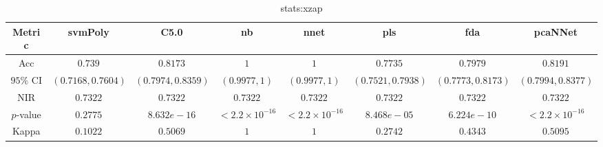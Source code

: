 \begin{table}[!ht]
	\centering
	\begin{tabular}{|c|c|c|c|c|c|c|c|}
		\hline
		Metric & svmPoly & C5.0 & nb & nnet & pls & fda & pcaNNet \\ \hline
		Acc & $0.739$ & $0.8173$ & $1$ & $1$ & $0.7735$ & $0.7979$ & $0.8191$ \\ \hline
		$95\%$ CI & $(0.7168, 0.7604)$ & $(0.7974, 0.8359)$ & $(0.9977, 1)$ & $(0.9977, 1)$ & $(0.7521, 0.7938)$ & $(0.7773, 0.8173)$ & $(0.7994, 0.8377)$ \\ \hline
		NIR & $0.7322$ & $0.7322$ & $0.7322$ & $0.7322$ & $0.7322$ & $0.7322$ & $0.7322$ \\ \hline
		$p$-value & $0.2775$ & $8.632e-16$ & $< 2.2 \times {10}^{-16}$ & $< 2.2 \times {10}^{-16}$ & $8.468e-05$ & $6.224e-10$ & $< 2.2 \times {10}^{-16}$ \\ \hline
		Kappa & $0.1022$ & $0.5069$ & $1$ & $1$ & $0.2742$ & $0.4343$ & $0.5095$ \\ \hline
	\end{tabular}
	\caption{stats:xzap}
	\label{tab:stats:xzap}
\end{table}
